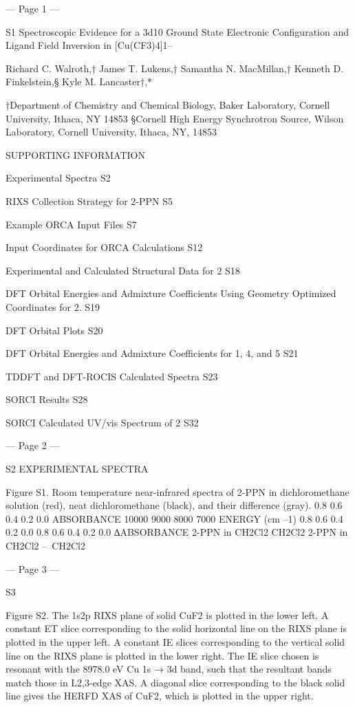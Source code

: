--- Page 1 ---
 
S1 
Spectroscopic Evidence for a 3d10 Ground 
State Electronic Configuration and Ligand 
Field Inversion in [Cu(CF3)4]1– 
 
Richard C. Walroth,† James T. Lukens,† Samantha N. MacMillan,† Kenneth D. Finkelstein,§  
Kyle M. Lancaster†,* 
 
†Department of Chemistry and Chemical Biology, Baker Laboratory, Cornell University, Ithaca, 
NY 14853 
§Cornell High Energy Synchrotron Source, Wilson Laboratory, Cornell University, Ithaca, NY, 
14853 
 
SUPPORTING INFORMATION 
 
Experimental Spectra 
S2 
 
RIXS Collection Strategy for 2-PPN 
S5 
 
Example ORCA Input Files 
S7 
 
Input Coordinates for ORCA Calculations 
S12 
 
Experimental and Calculated Structural Data for 2 
S18 
 
DFT Orbital Energies and Admixture Coefficients Using Geometry  
Optimized Coordinates for 2. 
S19 
 
DFT Orbital Plots 
S20 
 
DFT Orbital Energies and Admixture Coefficients for 1, 4, and 5 
S21 
 
TDDFT and DFT-ROCIS Calculated Spectra 
S23 
 
SORCI Results 
S28 
 
SORCI Calculated UV/vis Spectrum of 2 
S32 
 
 


--- Page 2 ---
 
S2 
EXPERIMENTAL SPECTRA 
 
 
 
Figure S1. Room temperature near-infrared spectra of 2-PPN in dichloromethane solution (red), 
neat dichloromethane (black), and their difference (gray).  
0.8
0.6
0.4
0.2
0.0
ABSORBANCE
10000
9000
8000
7000
ENERGY (cm
–1)
0.8
0.6
0.4
0.2
0.0
0.8
0.6
0.4
0.2
0.0
∆ABSORBANCE
2-PPN in CH2Cl2
CH2Cl2
2-PPN in CH2Cl2 – CH2Cl2


--- Page 3 ---
 
S3 
 
Figure S2. The 1s2p RIXS plane of solid CuF2 is plotted in the lower left. A constant ET slice 
corresponding to the solid horizontal line on the RIXS plane is plotted in the upper left. A 
constant IE slices corresponding to the vertical solid line on the RIXS plane is plotted in the 
lower right. The IE slice chosen is resonant with the 8978.0 eV Cu 1s → 3d band, such that the 
resultant bands match those in L2,3-edge XAS. A diagonal slice corresponding to the black solid 
line gives the HERFD XAS of CuF2, which is plotted in the upper right. 
 


